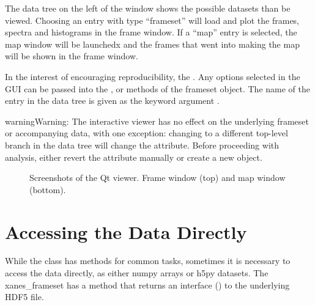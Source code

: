 \documentclass[letterpaper,10pt,english]{sphinxmanual}
\begin{document}
The data tree on the left of the window shows the possible datasets
than be viewed. Choosing an entry with type “frameset” will load and
plot the frames, spectra and histograms in the frame window. If a
“map” entry is selected, the map window will be launchedx and the
frames that went into making the map will be shown in the frame
window.

In the interest of encouraging reproducibility, the . Any options selected
in the GUI can be passed into the ,  or
 methods of the frameset object. The name of the
entry in the data tree is given as the keyword argument
.

\begin{sphinxadmonition}{warning}{Warning:}
The interactive viewer has no effect on the underlying
frameset or accompanying data, with one exception:
changing to a different top-level branch in the data tree
will change the 
attribute. Before proceeding with analysis, either revert
the  attribute manually or create a new
 object.
\end{sphinxadmonition}
\begin{figure}[htbp]
\centering

\noindent{}
\end{figure}
\begin{figure}[htbp]
\centering
\capstart

\noindent{}
\caption{Screenshots of the Qt viewer. Frame window (top) and map window
(bottom).}\label{\detokenize{visualization:id1}}\end{figure}


\chapter{Accessing the Data Directly}
\label{\detokenize{data_stores::doc}}\label{\detokenize{data_stores:accessing-the-data-directly}}
While the {\hyperref[\detokenize{xanespy:xanespy.xanes_frameset.XanesFrameset}]{}} class has
methods for common tasks, sometimes it is necessary to access the data
directly, as either numpy arrays or h5py datasets. The xanes\_frameset
has a {\hyperref[\detokenize{xanespy:xanespy.xanes_frameset.XanesFrameset.store}]{}} method
that returns an interface () to the underlying HDF5 file.
\end{document}
